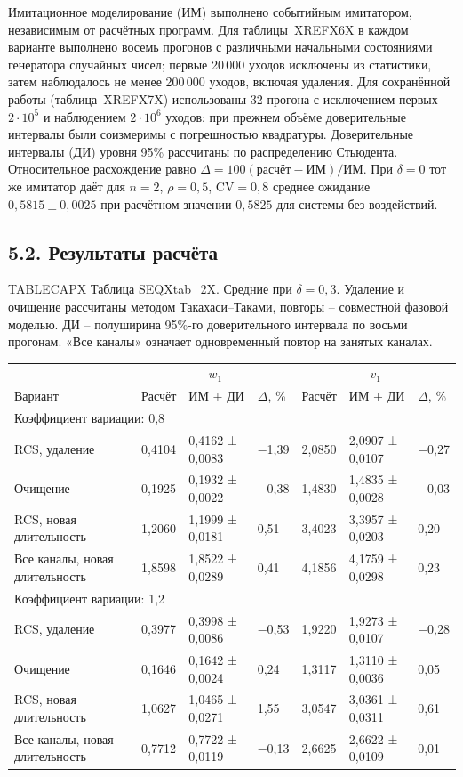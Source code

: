 Имитационное моделирование (ИМ) выполнено событийным имитатором, независимым от расчётных программ. Для таблицы~XREFX6X в каждом варианте выполнено восемь прогонов с различными начальными состояниями генератора случайных чисел; первые 20\,000 уходов исключены из статистики, затем наблюдалось не менее 200\,000 уходов, включая удаления. Для сохранённой работы (таблица~XREFX7X) использованы 32 прогона с исключением первых \(2\cdot10^5\) и наблюдением \(2\cdot10^6\) уходов: при прежнем объёме доверительные интервалы были соизмеримы с погрешностью квадратуры. Доверительные интервалы (ДИ) уровня 95\% рассчитаны по распределению Стьюдента. Относительное расхождение равно \(\Delta=100(\text{расчёт}-\text{ИМ})/\text{ИМ}\). При \(\delta=0\) тот же имитатор даёт для \(n=2\), \(\rho=0{,}5\), \(\mathrm{CV}=0{,}8\) среднее ожидание \(0{,}5815\pm0{,}0025\) при расчётном значении \(0{,}5825\) для системы без воздействий.

\subsection*{5.2. Результаты расчёта}
\noindent TABLECAPX Таблица SEQXtab_2X. Средние при $\delta=0{,}3$. Удаление и очищение рассчитаны методом Такахаси--Таками, повторы -- совместной фазовой моделью. ДИ -- полуширина 95\%-го доверительного интервала по восьми прогонам. «Все каналы» означает одновременный повтор на занятых каналах.\par

\setlength{\tabcolsep}{2pt}
\begin{tabular}{p{4.16cm}p{1.61cm}p{2.83cm}p{1.28cm}p{1.61cm}p{2.83cm}p{1.28cm}}
\toprule
 & \multicolumn{3}{c}{$w_1$} & \multicolumn{3}{c}{$v_1$} \\
Вариант & Расчёт & ИМ $\pm$ ДИ & $\Delta$, \% & Расчёт & ИМ $\pm$ ДИ & $\Delta$, \% \\
\midrule
\multicolumn{7}{l}{Коэффициент вариации: 0,8} \\
RCS, удаление & 0,4104 & 0,4162 ± 0,0083 & −1,39 & 2,0850 & 2,0907 ± 0,0107 & −0,27 \\
Очищение & 0,1925 & 0,1932 ± 0,0022 & −0,38 & 1,4830 & 1,4835 ± 0,0028 & −0,03 \\
RCS, новая длительность & 1,2060 & 1,1999 ± 0,0181 & 0,51 & 3,4023 & 3,3957 ± 0,0203 & 0,20 \\
Все каналы, новая длительность & 1,8598 & 1,8522 ± 0,0289 & 0,41 & 4,1856 & 4,1759 ± 0,0298 & 0,23 \\
\multicolumn{7}{l}{Коэффициент вариации: 1,2} \\
RCS, удаление & 0,3977 & 0,3998 ± 0,0086 & −0,53 & 1,9220 & 1,9273 ± 0,0107 & −0,28 \\
Очищение & 0,1646 & 0,1642 ± 0,0024 & 0,24 & 1,3117 & 1,3110 ± 0,0036 & 0,05 \\
RCS, новая длительность & 1,0627 & 1,0465 ± 0,0271 & 1,55 & 3,0547 & 3,0361 ± 0,0311 & 0,61 \\
Все каналы, новая длительность & 0,7712 & 0,7722 ± 0,0119 & −0,13 & 2,6625 & 2,6622 ± 0,0109 & 0,01 \\
\bottomrule
\end{tabular}




